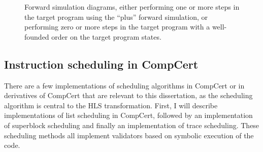 \begin{figure}
  \centering
  \begin{subfigure}[b]{0.48\linewidth}
    \centering
  \end{subfigure}\hfill%
  \begin{subfigure}[b]{0.48\linewidth}
    \centering
  \end{subfigure}
  \caption[Examples of forward simulation diagrams.]{Forward simulation
    diagrams, either performing one or more steps in the target program using
    the \enquote{plus} forward simulation, or performing zero or more steps in
    the target program with a well-founded order on the target program states.}%
  \label{fig:bg:forwards-simulation-diagram}
\end{figure}

\subsection{Instruction scheduling in CompCert}%
\label{sec:bg:instruction-scheduling-compcert}

There are a few implementations of scheduling algorithms in CompCert or in
derivatives of CompCert that are relevant to this dissertation, as the
scheduling algorithm is central to the \gls{HLS} transformation.  First, I will
describe implementations of list scheduling in CompCert, followed by an
implementation of superblock scheduling and finally an implementation of trace
scheduling.  These scheduling methods all implement validators based on symbolic
execution of the code.

